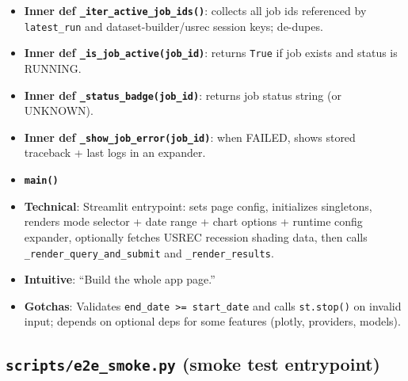 \documentclass[11pt]{article}
\begin{document}
\begin{itemize}[leftmargin=*,nosep]
\item \textbf{Inner def \texttt{\_iter\_active\_job\_ids()}}: collects all job ids referenced by \texttt{latest\_run} and dataset-builder/usrec session keys; de-dupes.
\end{itemize}


\begin{itemize}[leftmargin=*,nosep]
\item \textbf{Inner def \texttt{\_is\_job\_active(job\_id)}}: returns \texttt{True} if job exists and status is RUNNING.
\end{itemize}


\begin{itemize}[leftmargin=*,nosep]
\item \textbf{Inner def \texttt{\_status\_badge(job\_id)}}: returns job status string (or UNKNOWN).
\end{itemize}


\begin{itemize}[leftmargin=*,nosep]
\item \textbf{Inner def \texttt{\_show\_job\_error(job\_id)}}: when FAILED, shows stored traceback + last logs in an expander.
\end{itemize}



\begin{itemize}[leftmargin=*,nosep]
\item \textbf{\texttt{main()}}
\item \textbf{Technical}: Streamlit entrypoint: sets page config, initializes singletons, renders mode selector + date range + chart options + runtime config expander, optionally fetches USREC recession shading data, then calls \texttt{\_render\_query\_and\_submit} and \texttt{\_render\_results}.
\item \textbf{Intuitive}: “Build the whole app page.”
\item \textbf{Gotchas}: Validates \texttt{end\_date >= start\_date} and calls \texttt{st.stop()} on invalid input; depends on optional deps for some features (plotly, providers, models).
\end{itemize}


\subsection{\texttt{scripts/e2e\_smoke.py} (smoke test entrypoint)}
\end{document}
